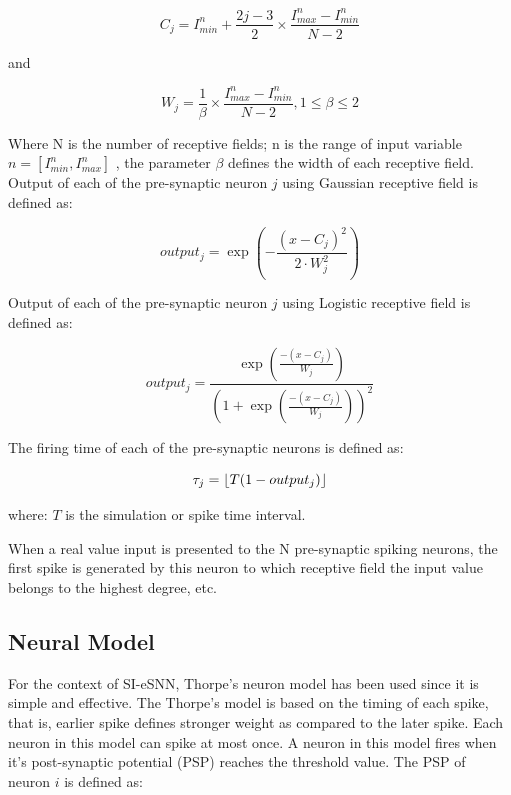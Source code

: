 \begin{equation}
C_j=I_{min}^n + \frac{2j-3}{2}\times \frac{I^n_{max}-I^n_{min}}{N-2}
\end{equation}

and 

\begin{equation}
W_j=\frac{1}{\beta}\times \frac{I^n_{max}-I^n_{min}}{N-2}, 1\leq \beta \leq 2
\end{equation}

Where N is the number of receptive fields; n is the range of input variable $n = [I_{min}^n, I_{max}^n ]$ , the parameter $\beta$ defines the width of each receptive field. Output of each of the pre-synaptic neuron $j$ using Gaussian receptive field is defined as:

\begin{equation}
output_j=\exp(-\frac{(x-C_j)^2}{2\cdot W_j^2})
\end{equation}

Output of each of the pre-synaptic neuron $j$ using Logistic receptive field is defined as:

\begin{equation}
output_j=\frac{\exp(\frac{-(x-C_j)}{W_j})}{(1+\exp(\frac{-(x-C_j)}{W_j}))^2}
\end{equation}

The firing time of each of the pre-synaptic neurons is defined as:

\begin{equation}
\tau_j=\lfloor T(1-output_j)\rfloor
\end{equation}

where: $T$ is the simulation or spike time interval.

When a real value input is presented to the N pre-synaptic spiking neurons, the first spike is generated by this neuron to which receptive field the input value belongs to the highest  degree, etc.  



\subsection{Neural Model}

For the context of SI-eSNN, Thorpe’s neuron model \citep{thorpe1997rapid} has been used since it is simple and effective. The Thorpe’s model is based on the timing of each spike, that is, earlier spike defines stronger weight as compared to the later spike. Each neuron in this model can spike at most once. A neuron in this model fires when it’s post-synaptic potential (PSP) reaches the threshold value. The PSP of neuron $i$ is defined as:

